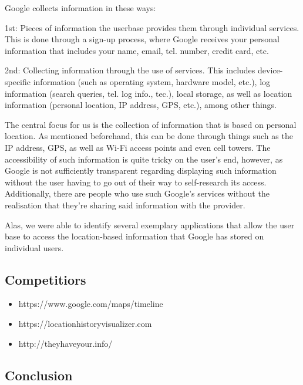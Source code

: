 \documentclass[12p]{article}
\begin{document}
        Google collects information in these ways: \cite{GooglePrivacyPolicy}
        
        1st: Pieces of information the userbase provides them through individual services. This is done through a sign-up process, where Google receives your personal information that includes your name, email, tel. number, credit card, etc.
        
        2nd: Collecting information through the use of services. This includes device-specific information (such as operating system, hardware model, etc.), log information (search queries, tel. log info., tec.), local storage, as well as location information (personal location, IP address, GPS, etc.), among other things.
        
        The central focus for us is the collection of information that is based on personal location. As mentioned beforehand, this can be done through things such as the IP address, GPS, as well as Wi-Fi access points and even cell towers. The accessibility of such information is quite tricky on the user’s end, however, as Google is not sufficiently transparent regarding displaying such information without the user having to go out of their way to self-research its access. Additionally, there are people who use such Google's services without the realisation that they’re sharing said information with the provider.
		
		Alas, we were able to identify several exemplary applications that allow the user base to access the location-based information that Google has stored on individual users.
		
		\newpage
    		\subsection{Competitiors}
    		\begin{itemize}
    			\item https://www.google.com/maps/timeline
    			\item https://locationhistoryvisualizer.com
    			\item http://theyhaveyour.info/
    		\end{itemize}
		
		\newpage
		\subsection{Conclusion}
		
		
\end{document}
